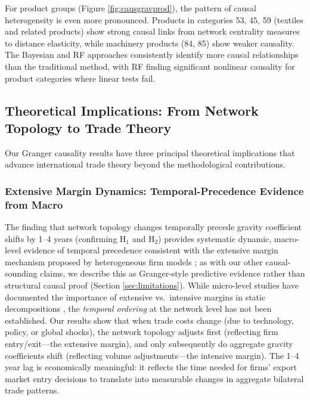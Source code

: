 \documentclass[preprint, 3p,
authoryear]{elsarticle} %
\begin{document}
For product groups (Figure \ref{fig:causgravprod}), the pattern of
causal heterogeneity is even more pronounced. Products in categories 53,
45, 59 (textiles and related products) show strong causal links from
network centrality measures to distance elasticity, while machinery
products (84, 85) show weaker causality. The Bayesian and RF approaches
consistently identify more causal relationships than the traditional
method, with RF finding significant nonlinear causality for product
categories where linear tests fail.

\subsection{Theoretical Implications: From Network Topology to Trade
Theory}\label{subsec:theory_implications}

Our Granger causality results have three principal theoretical
implications that advance international trade theory beyond the
methodological contributions.

\subsubsection{Extensive Margin Dynamics: Temporal-Precedence Evidence
from
Macro}\label{extensive-margin-dynamics-causal-evidence-from-macro-data}

The finding that network topology changes temporally precede gravity
coefficient shifts by 1--4 years (confirming H\(_1\) and H\(_2\))
provides systematic dynamic, macro-level evidence of temporal precedence
consistent with the extensive margin mechanism proposed by heterogeneous
firm models \citep{helpman2008, melitz2015new, chaney2014}; as with our
other causal-sounding claims, we describe this as Granger-style
predictive evidence rather than structural causal proof (Section
\ref{sec:limitations}). While micro-level studies have documented the
importance of extensive vs.~intensive margins in static decompositions
\citep{helpman2008}, the \textit{temporal ordering} at the network level
has not been established. Our results show that when trade costs change
(due to technology, policy, or global shocks), the network topology
adjusts first (reflecting firm entry/exit---the extensive margin), and
only subsequently do aggregate gravity coefficients shift (reflecting
volume adjustments---the intensive margin). The 1--4 year lag is
economically meaningful: it reflects the time needed for firms' export
market entry decisions to translate into measurable changes in aggregate
bilateral trade patterns.
\end{document}

